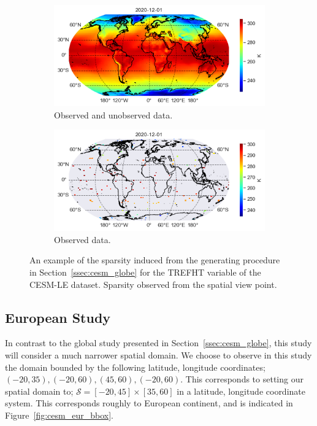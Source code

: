 \begin{figure}
	\centering
	\begin{subfigure}[b]{0.45\textwidth}
		\includegraphics[width=\textwidth]{globe_sparse_full}
		\caption{Observed and unobserved data.}
	\end{subfigure}
	\hfill        
	\begin{subfigure}[b]{0.45\textwidth}
		\includegraphics[width=\textwidth]{globe_sparse_train}
		\caption{Observed data.}
	\end{subfigure}
	\caption{An example of the sparsity induced from the  generating procedure in Section~\ref{ssec:cesm_globe} for the TREFHT variable of the CESM-LE dataset. Sparsity observed from the spatial view point.}
	\label{fig:cesm_sparsity}
\end{figure}

\subsection{European Study \label{ssec:cesm_eur}}
In contrast to the global study presented in Section~\ref{ssec:cesm_globe}, this study will consider a much narrower spatial domain.
We choose to observe in this study the domain bounded by the following latitude, longitude coordinates; $\left(-20, 35\right), \left(-20, 60\right), \left(45, 60\right), \left(-20, 60\right)$.
This corresponds to setting our spatial domain to; $\mathcal{S} = \left[-20, 45\right] \times \left[35, 60\right]$ in a latitude, longitude coordinate system.
This corresponds roughly to European continent, and is indicated in Figure~\ref{fig:cesm_eur_bbox}.

